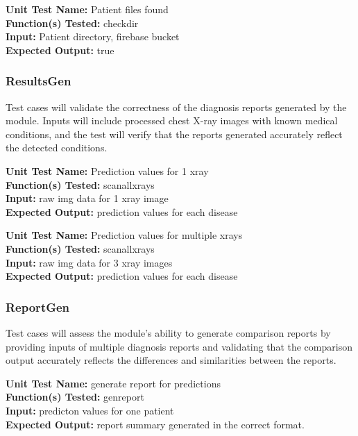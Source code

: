 \documentclass[12pt, titlepage]{article}
\begin{document}
\begin{mdframed}[linewidth=0.5mm]
  \textbf{Unit Test Name:} Patient files found \\
  \textbf{Function(s) Tested:} checkdir \\
  \textbf{Input:} Patient directory, firebase bucket \\
  \textbf{Expected Output:} true  
\end{mdframed}

\subsubsection{ResultsGen}
Test cases will validate the correctness of the diagnosis reports generated by the module. Inputs will include processed chest X-ray images with known medical conditions, and the test will verify that the reports generated accurately reflect the detected conditions.

\begin{mdframed}[linewidth=0.5mm]
  \textbf{Unit Test Name:} Prediction values for 1 xray \\
  \textbf{Function(s) Tested:} scanallxrays \\
  \textbf{Input:} raw img data for 1 xray image \\
  \textbf{Expected Output:} prediction values for each disease  
\end{mdframed}

\begin{mdframed}[linewidth=0.5mm]
  \textbf{Unit Test Name:} Prediction values for multiple xrays \\
  \textbf{Function(s) Tested:} scanallxrays \\
  \textbf{Input:} raw img data for 3 xray images \\
  \textbf{Expected Output:} prediction values for each disease  
\end{mdframed}

\subsubsection{ReportGen}
Test cases will assess the module's ability to generate comparison reports by providing inputs of multiple diagnosis reports and validating that the comparison output accurately reflects the differences and similarities between the reports.

\begin{mdframed}[linewidth=0.5mm]
  \textbf{Unit Test Name:} generate report for predictions \\
  \textbf{Function(s) Tested:} genreport \\
  \textbf{Input:} predicton values for one patient \\
  \textbf{Expected Output:} report summary generated in the correct format.  
\end{mdframed}
\end{document}
